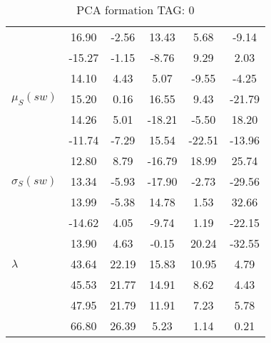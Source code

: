 \begin{table}[h!]
\begin{center}
\begin{tabular}{| l || c | c | c | c | c |}
 & 16.90  & -2.56  & 13.43  & 5.68  & -9.14 \\
 & -15.27  & -1.15  & -8.76  & 9.29  & 2.03 \\
 & 14.10  & 4.43  & 5.07  & -9.55  & -4.25 \\\hline
$\mu_S(sw)$ & 15.20  & 0.16  & 16.55  & 9.43  & -21.79 \\
 & 14.26  & 5.01  & -18.21  & -5.50  & 18.20 \\
 & -11.74  & -7.29  & 15.54  & -22.51  & -13.96 \\
 & 12.80  & 8.79  & -16.79  & 18.99  & 25.74 \\\hline
$\sigma_S(sw)$ & 13.34  & -5.93  & -17.90  & -2.73  & -29.56 \\
 & 13.99  & -5.38  & 14.78  & 1.53  & 32.66 \\
 & -14.62  & 4.05  & -9.74  & 1.19  & -22.15 \\
 & 13.90  & 4.63  & -0.15  & 20.24  & -32.55 \\\hline\hline
$\lambda$ & 43.64  & 22.19  & 15.83  & 10.95  & 4.79 \\
 & 45.53  & 21.77  & 14.91  & 8.62  & 4.43 \\
 & 47.95  & 21.79  & 11.91  & 7.23  & 5.78 \\
 & 66.80  & 26.39  & 5.23  & 1.14  & 0.21 \\\hline
\end{tabular}
\caption{PCA formation TAG: 0}
\end{center}
\end{table}